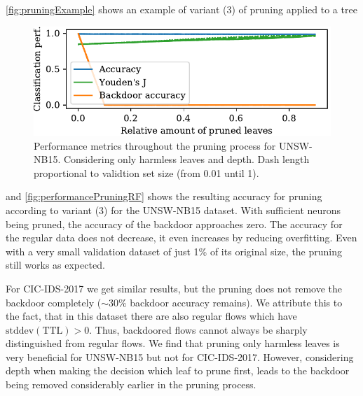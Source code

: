 \documentclass[10pt,sigconf,letterpaper,dvipsnames]{acmart}
\newcommand\note[2]{{\color{#1}#2}}
\newcommand\todo[1]{{\note{red}{TODO: #1}}}
\newcommand{\unsw}{UNSW-NB15}
\newcommand{\cic}{CIC-IDS-2017}
\begin{document}
\autoref{fig:pruningExample} shows an example of variant (3) of pruning applied to a tree
\begin{figure}[h]
\includegraphics[width=\columnwidth]{../prune_CAIA_backdoor_15/prune_oh_d.pdf}
\caption{Performance metrics throughout the pruning process for \unsw{}. Considering only harmless leaves and depth. Dash length proportional to validtion set size (from 0.01 until 1).}
\label{fig:performancePruningRF}
\end{figure}
and \autoref{fig:performancePruningRF} shows the resulting accuracy for pruning according to variant (3) for the \unsw{} dataset. With sufficient neurons being pruned, the accuracy of the backdoor approaches zero. The accuracy for the regular data does not decrease, it even increases by
reducing overfitting. %
Even with a very small validation dataset of just 1\% of its original size, the pruning still works as expected.

For \cic{} we get similar results, but the pruning does not remove the backdoor completely ($\sim$30\% backdoor accuracy remains). We attribute this to the fact, that in this dataset there are also regular flows which have $\text{stddev}(\text{TTL}) > 0$. Thus, backdoored flows cannot always be sharply distinguished from regular flows. We find that pruning only harmless leaves is very beneficial for \unsw{} but not for \cic{}. However, considering depth when making the decision which leaf to prune first, leads to the backdoor being removed considerably earlier in the pruning process.
\end{document}
